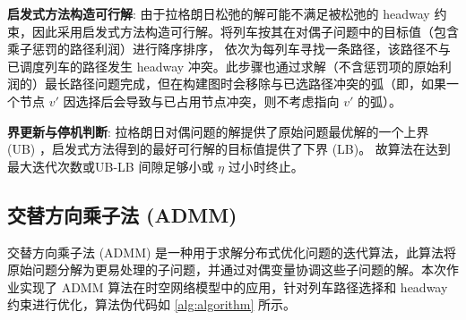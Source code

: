 \documentclass{article}
\begin{document}
    \textbf{启发式方法构造可行解}:
    由于拉格朗日松弛的解可能不满足被松弛的 headway
    约束，因此采用启发式方法构造可行解。将列车按其在对偶子问题中的目标值（包含乘子惩罚的路径利润）进行降序排序，
    依次为每列车寻找一条路径，该路径不与已调度列车的路径发生 headway
    冲突。此步骤也通过求解（不含惩罚项的原始利润的）最长路径问题完成，但在构建图时会移除与已选路径冲突的弧（即，如果一个节点
    $v'$ 因选择后会导致与已占用节点冲突，则不考虑指向 $v'$ 的弧）。

    \textbf{界更新与停机判断}:
    拉格朗日对偶问题的解提供了原始问题最优解的一个上界 (UB) ，启发式方法得到的最好可行解的目标值提供了下界 (LB)。
    故算法在达到最大迭代次数或UB-LB 间隙足够小或 $\eta$ 过小时终止。

    \subsection{交替方向乘子法 (ADMM)}\label{subsec:-(admm)}
    交替方向乘子法 (ADMM)
    是一种用于求解分布式优化问题的迭代算法，此算法将原始问题分解为更易处理的子问题，并通过对偶变量协调这些子问题的解。本次作业实现了 ADMM
    算法在时空网络模型中的应用，针对列车路径选择和 headway 约束进行优化，算法伪代码如 \ref{alg:algorithm} 所示。
\end{document}
